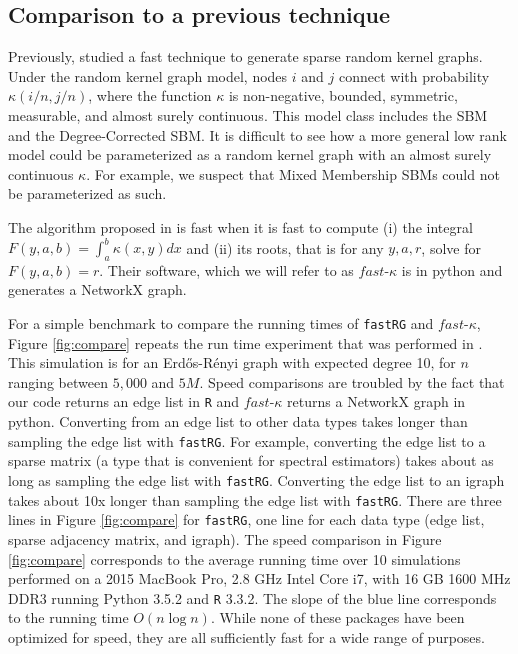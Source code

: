 \documentclass[twoside,11pt]{article}
\begin{document}
\subsection{Comparison to a previous technique}

Previously, \cite{hagberg2015fast} studied a fast technique to generate sparse random kernel graphs.  Under the random kernel graph model, nodes $i$ and $j$ connect with probability $\kappa(i/n,j/n)$, where the  function $\kappa$ is non-negative, bounded, symmetric, measurable, and almost surely continuous.  This model class includes the SBM and the Degree-Corrected SBM.  It is difficult to see how a more general low rank model could be parameterized as a random kernel graph with an almost surely continuous $\kappa$.  For example, we suspect that Mixed Membership SBMs could not be parameterized as such.

The algorithm proposed in \cite{hagberg2015fast}  is fast when it is fast to compute  (i) the integral $F(y,a,b) = \int_a^b \kappa(x,y)dx$ and (ii) its roots, that is for any $y,a,r$, solve for $F(y,a,b) = r$.  Their software, which we  will refer to as  $fast$-$\kappa$ is in python and generates a NetworkX graph.  

For a simple benchmark to compare the running times of \texttt{fastRG} and $fast$-$\kappa$, Figure \ref{fig:compare} repeats the run  time experiment that  was  performed in \cite{hagberg2015fast}.  This simulation is for an Erd\H{o}s-R\'enyi graph with expected degree 10, for $n$ ranging between $5,000$ and $5M$.  Speed comparisons are troubled by the fact that our code returns an edge  list  in  \texttt{R} and $fast$-$\kappa$ returns a NetworkX graph  in  python. Converting from  an edge list to other data types takes longer than sampling the edge list with \texttt{fastRG}.  For example, converting the edge list to a sparse matrix (a type that is convenient for spectral estimators) takes about as long as  sampling the edge list with \texttt{fastRG}.  Converting the edge list to an igraph takes about 10x longer than sampling the edge list with \texttt{fastRG}.  There are three lines  in  Figure  \ref{fig:compare} for \texttt{fastRG}, one line for each data type (edge list, sparse adjacency matrix, and  igraph).  The speed comparison in Figure \ref{fig:compare} corresponds to the average running time over 10 simulations performed on a 2015 MacBook Pro, 2.8 GHz Intel Core i7, with  16 GB 1600 MHz DDR3  running Python 3.5.2  and \texttt{R} 3.3.2.  The slope of the  blue line  corresponds  to the running time $O(n \log  n)$.  
While none of these packages have been optimized for speed,  they are all sufficiently fast for  a wide  range  of purposes.  
\end{document}
